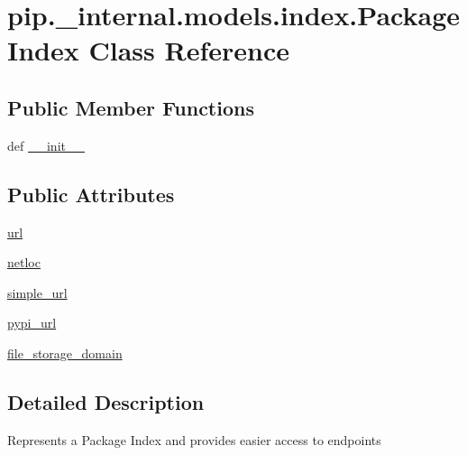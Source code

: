 \hypertarget{classpip_1_1__internal_1_1models_1_1index_1_1PackageIndex}{}\section{pip.\+\_\+internal.\+models.\+index.\+Package\+Index Class Reference}
\label{classpip_1_1__internal_1_1models_1_1index_1_1PackageIndex}
\subsection*{Public Member Functions}
\begin{DoxyCompactItemize}
\item 
def \hyperlink{classpip_1_1__internal_1_1models_1_1index_1_1PackageIndex_a5484fc47123b2b14c3c38304507cee10}{\+\_\+\+\_\+init\+\_\+\+\_\+}
\end{DoxyCompactItemize}
\subsection*{Public Attributes}
\begin{DoxyCompactItemize}
\item 
\hyperlink{classpip_1_1__internal_1_1models_1_1index_1_1PackageIndex_a3c533756a88867b52132951a138a2606}{url}
\item 
\hyperlink{classpip_1_1__internal_1_1models_1_1index_1_1PackageIndex_abef29be7973b7a70d7660848485aceb6}{netloc}
\item 
\hyperlink{classpip_1_1__internal_1_1models_1_1index_1_1PackageIndex_a940312d4da8d1b3737f48b62588e34b4}{simple\+\_\+url}
\item 
\hyperlink{classpip_1_1__internal_1_1models_1_1index_1_1PackageIndex_a563fa787d83ed80d9354ea952ec0451d}{pypi\+\_\+url}
\item 
\hyperlink{classpip_1_1__internal_1_1models_1_1index_1_1PackageIndex_afd61f4356cb797dda5939fec529f49fd}{file\+\_\+storage\+\_\+domain}
\end{DoxyCompactItemize}


\subsection{Detailed Description}
\begin{DoxyVerb}Represents a Package Index and provides easier access to endpoints
\end{DoxyVerb}
 

